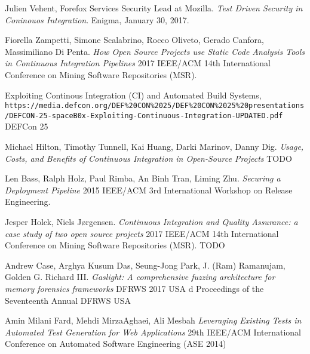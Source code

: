 \begin{thebibliography}{9}
Julien Vehent, Forefox Services Security Lead at Mozilla. 
\textit{Test Driven Security in Coninouos Integration}. 
Enigma, January 30, 2017.
 
Fiorella Zampetti, Simone Scalabrino, Rocco Oliveto, Gerado Canfora, Massimiliano Di Penta. 
\textit{How Open Source Projects use Static Code Analysis Tools in Continuous Integration Pipelines}
2017 IEEE/ACM 14th International Conference on Mining Software Repositories (MSR).
 
Exploiting Continous Integration (CI) and Automated Build Systems,
\\\texttt{https://media.defcon.org/DEF\%20CON\%2025/DEF\%20CON\%2025\%20presentations/DEFCON-25-spaceB0x-Exploiting-Continuous-Integration-UPDATED.pdf}
DEFCon 25

Michael Hilton, Timothy Tunnell, Kai Huang, Darki Marinov, Danny Dig. 
\textit{Usage, Costs, and Benefits of Continuous Integration in Open-Source Projects}
TODO

Len Bass, Ralph Holz, Paul Rimba, An Binh Tran, Liming Zhu. 
\textit{Securing a Deployment Pipeline}
2015 IEEE/ACM 3rd International Workshop on Release Engineering.

Jesper Holck, Niels Jørgensen.
\textit{Continuous Integration and Quality Assurance: a case study of two open source projects}
2017 IEEE/ACM 14th International Conference on Mining Software Repositories (MSR).
TODO

Andrew Case, Arghya Kusum Das, Seung-Jong Park, J. (Ram) Ramanujam, Golden G. Richard III.
\textit{Gaslight: A comprehensive fuzzing architecture for memory forensics frameworks}
DFRWS 2017 USA d Proceedings of the Seventeenth Annual DFRWS USA

Amin Milani Fard, Mehdi MirzaAghaei, Ali Mesbah
\textit{Leveraging Existing Tests in Automated Test Generation for Web Applications}
29th IEEE/ACM International Conference on Automated Software Engineering (ASE 2014)

\end{thebibliography}
